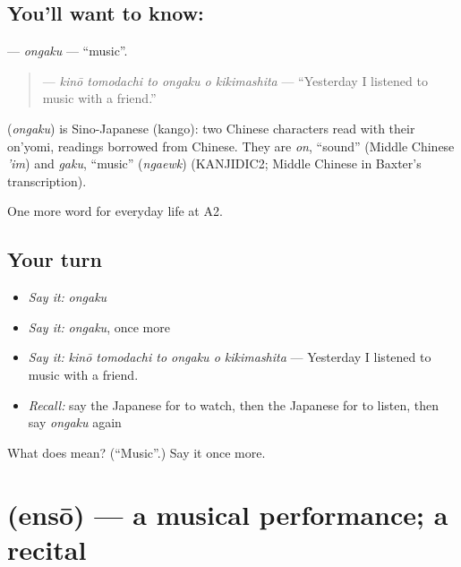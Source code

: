 \subsection*{You'll want to know: }
\textbf{} — \emph{ongaku} — \textquotedblleft{}music\textquotedblright{}.

\begin{quote}
\textbf{   } — \emph{kinō tomodachi to ongaku o kikimashita} — \textquotedblleft{}Yesterday I listened to music with a friend.\textquotedblright{}
\end{quote}

\begin{cousinweb}
\textbf{} (\emph{ongaku}) is Sino-Japanese (kango): two Chinese characters read with their on'yomi, readings borrowed from Chinese. They are \emph{on}, \textquotedblleft{}sound\textquotedblright{} (Middle Chinese \emph{'im}) and \emph{gaku}, \textquotedblleft{}music\textquotedblright{} (\emph{ngaewk}) (KANJIDIC2; Middle Chinese in Baxter's transcription).
\end{cousinweb}

\begin{grammarlens}[title={What you've built}]
One more word for everyday life at A2.
\end{grammarlens}

\subsection*{Your turn}
\begin{itemize}
\raggedright
  \item \emph{Say it:} \emph{ongaku}
  \item \emph{Say it:} \emph{ongaku}, once more
  \item \emph{Say it:} \emph{kinō tomodachi to ongaku o kikimashita} — Yesterday I listened to music with a friend.
  \item \emph{Recall:} say the Japanese for to watch, then the Japanese for to listen, then say \emph{ongaku} again
\end{itemize}

\begin{tcolorbox}[breakable,colback=teal!4,colframe=teal!35!black,title={Before you move on}]
What does  mean? (\textquotedblleft{}Music\textquotedblright{}.) Say it once more.
\end{tcolorbox}
\section[\texorpdfstring{\ja{えんそう} (ensō)}{えんそう (ensō)}]{ (ensō) — a musical performance; a recital}

